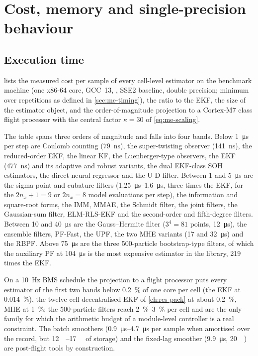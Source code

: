 \chapter{Cost, memory and single-precision behaviour}
\label{ch:res-numerics}

\section{Execution time}

 lists the measured cost per sample of every cell-level estimator on the
benchmark machine (one x86-64 core, GCC~13, , SSE2 baseline, double precision;
minimum over repetitions as defined in \cref{sec:me-timing}), the ratio to the EKF, the size of
the estimator object, and the order-of-magnitude projection to a Cortex-M7 class flight
processor with the central factor $\kappa = 30$ of \cref{eq:me-scaling}.



The table spans three orders of magnitude and falls into four bands. Below
\SI{1}{\micro\second} per step are Coulomb counting (\SI{79}{\nano\second}), the
super-twisting observer (\SI{141}{\nano\second}), the reduced-order EKF, the linear KF, the
Luenberger-type observers, the EKF (\SI{477}{\nano\second}) and its adaptive and robust
variants, the dual EKF-class SOH estimators, the direct neural regressor and the U-D filter.
Between \SI{1}{} and \SI{5}{\micro\second} are the sigma-point and cubature filters
(\SIrange{1.25}{1.6}{\micro\second}, three times the EKF, for the $2n_x+1 = 9$ or $2n_x = 8$
model evaluations per step), the information and square-root forms, the IMM, MMAE, the
Schmidt filter, the joint filters, the Gaussian-sum filter, ELM-RLS-EKF and the second-order
and fifth-degree filters. Between \SI{10}{} and \SI{40}{\micro\second} are the Gauss--Hermite
filter ($3^4 = 81$ points, \SI{12}{\micro\second}), the ensemble filters, PF-Fast, the UPF, the
two MHE variants (\SI{17}{} and \SI{32}{\micro\second}) and the RBPF. Above
\SI{75}{\micro\second} are the three 500-particle bootstrap-type filters, of which the
auxiliary PF at \SI{104}{\micro\second} is the most expensive estimator in the library, 219
times the EKF.

On a \SI{10}{\hertz} BMS schedule the projection to a flight processor puts every estimator of
the first two bands below \SI{0.2}{\percent} of one core per cell (the EKF at
\SI{0.014}{\percent}), the twelve-cell decentralised EKF of \cref{ch:res-pack} at about
\SI{0.2}{\percent}, MHE at \SI{1}{\percent}; the 500-particle filters reach
\SIrange{2}{3}{\percent} per cell and are the only family for which the arithmetic budget of a
module-level controller is a real constraint. The batch smoothers (\SIrange{0.9}{4.7}{\micro\second}
per sample when amortised over the record, but \SIrange{12}{17}{\mega\byte} of storage) and the
fixed-lag smoother (\SI{9.9}{\micro\second}, \SI{20}{\kilo\byte}) are post-flight tools by
construction.

